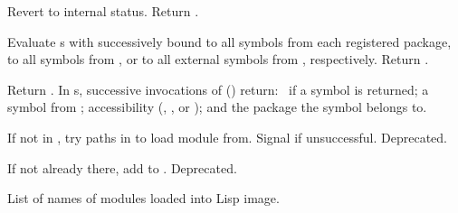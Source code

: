 \begin{LIST}{1cm}
  {
  Revert  to internal status. Return \retval{\T}.
  }
  
  {
  Evaluate s with  successively bound to all
  symbols from each registered package, to all symbols from
  , or to all external symbols from ,
  respectively. Return . 
  }

  {
  Return . In s, successive
  invocations of  () return: \T\ if a symbol is returned;
  a symbol from ; accessibility
  (, , or ); and the
  package the symbol belongs to.
  }

  {
  If not in , try paths in  to load
  module from. Signal  if unsuccessful. Deprecated.
  }

  {
  If not already there, add  to
  . Deprecated. 
  }

  {
  List of names of modules loaded into Lisp image.
  }

\end{LIST}


